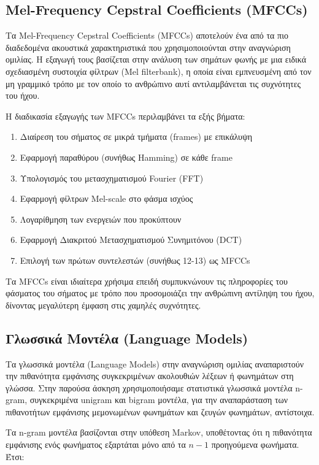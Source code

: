 \documentclass[a4paper,12pt]{article}
\begin{document}
\subsection{Mel-Frequency Cepstral Coefficients (MFCCs)}

Τα Mel-Frequency Cepstral Coefficients (MFCCs) αποτελούν ένα από τα πιο διαδεδομένα ακουστικά χαρακτηριστικά που χρησιμοποιούνται στην αναγνώριση ομιλίας. Η εξαγωγή τους βασίζεται στην ανάλυση των σημάτων φωνής με μια ειδικά σχεδιασμένη συστοιχία φίλτρων (Mel filterbank), η οποία είναι εμπνευσμένη από τον μη γραμμικό τρόπο με τον οποίο το ανθρώπινο αυτί αντιλαμβάνεται τις συχνότητες του ήχου.

Η διαδικασία εξαγωγής των MFCCs περιλαμβάνει τα εξής βήματα:

\begin{enumerate}
    \item Διαίρεση του σήματος σε μικρά τμήματα (frames) με επικάλυψη
    \item Εφαρμογή παραθύρου (συνήθως Hamming) σε κάθε frame
    \item Υπολογισμός του μετασχηματισμού Fourier (FFT)
    \item Εφαρμογή φίλτρων Mel-scale στο φάσμα ισχύος
    \item Λογαρίθμηση των ενεργειών που προκύπτουν
    \item Εφαρμογή Διακριτού Μετασχηματισμού Συνημιτόνου (DCT)
    \item Επιλογή των πρώτων συντελεστών (συνήθως 12-13) ως MFCCs
\end{enumerate}

Τα MFCCs είναι ιδιαίτερα χρήσιμα επειδή συμπυκνώνουν τις πληροφορίες του φάσματος του σήματος με τρόπο που προσομοιάζει την ανθρώπινη αντίληψη του ήχου, δίνοντας μεγαλύτερη έμφαση στις χαμηλές συχνότητες.

\subsection{Γλωσσικά Μοντέλα (Language Models)}

Τα γλωσσικά μοντέλα (Language Models) στην αναγνώριση ομιλίας αναπαριστούν την πιθανότητα εμφάνισης συγκεκριμένων ακολουθιών λέξεων ή φωνημάτων στη γλώσσα. Στην παρούσα άσκηση χρησιμοποιήσαμε στατιστικά γλωσσικά μοντέλα n-gram, συγκεκριμένα unigram και bigram μοντέλα, για την αναπαράσταση των πιθανοτήτων εμφάνισης μεμονωμένων φωνημάτων και ζευγών φωνημάτων, αντίστοιχα.

Τα n-gram μοντέλα βασίζονται στην υπόθεση Markov, υποθέτοντας ότι η πιθανότητα εμφάνισης ενός φωνήματος εξαρτάται μόνο από τα $n-1$ προηγούμενα φωνήματα. Έτσι:
\end{document}
